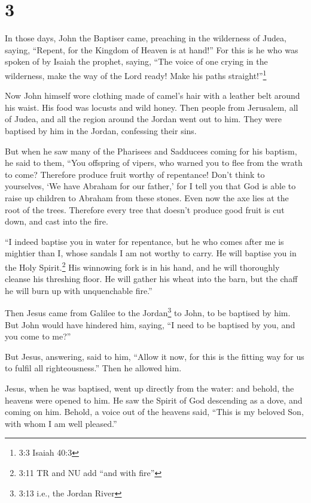 \hypertarget{section-2}{%
\section{3}\label{section-2}}

 In those days, John the Baptiser came, preaching in the
wilderness of Judea, saying,  ``Repent, for the Kingdom of
Heaven is at hand!''  For this is he who was spoken of by
Isaiah the prophet, saying, ``The voice of one crying in the wilderness,
make the way of the Lord ready! Make his paths straight!''\footnote{3:3
  Isaiah 40:3}

 Now John himself wore clothing made of camel's hair with a
leather belt around his waist. His food was locusts and wild honey.
 Then people from Jerusalem, all of Judea, and all the
region around the Jordan went out to him.  They were
baptised by him in the Jordan, confessing their sins.

 But when he saw many of the Pharisees and Sadducees coming
for his baptism, he said to them, ``You offspring of vipers, who warned
you to flee from the wrath to come?  Therefore produce fruit
worthy of repentance!  Don't think to yourselves, `We have
Abraham for our father,' for I tell you that God is able to raise up
children to Abraham from these stones.  Even now the axe
lies at the root of the trees. Therefore every tree that doesn't produce
good fruit is cut down, and cast into the fire.

 ``I indeed baptise you in water for repentance, but he who
comes after me is mightier than I, whose sandals I am not worthy to
carry. He will baptise you in the Holy Spirit.\footnote{3:11 TR and NU
  add ``and with fire''}  His winnowing fork is in his
hand, and he will thoroughly cleanse his threshing floor. He will gather
his wheat into the barn, but the chaff he will burn up with unquenchable
fire.''

 Then Jesus came from Galilee to the Jordan\footnote{3:13
  i.e., the Jordan River} to John, to be baptised by him. 
But John would have hindered him, saying, ``I need to be baptised by
you, and you come to me?''

 But Jesus, answering, said to him, ``Allow it now, for
this is the fitting way for us to fulfil all righteousness.'' Then he
allowed him.

 Jesus, when he was baptised, went up directly from the
water: and behold, the heavens were opened to him. He saw the Spirit of
God descending as a dove, and coming on him.  Behold, a
voice out of the heavens said, ``This is my beloved Son, with whom I am
well pleased.''

